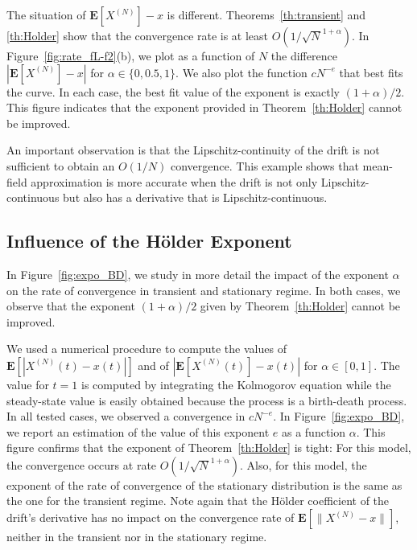 \documentclass[sigconf]{acmart}
\newcommand\XN{X^{(N)}}
\newcommand\sesp[1]{\mathbf{E}[#1]}
\newcommand\snorm[1]{\|#1\|}
\begin{document}
The situation of $\sesp{\XN}-x$ is
different. Theorems~\ref{th:transient} and \ref{th:Holder} show that
the convergence rate is at least $O(1/\sqrt{N}^{1+\alpha})$.  In
Figure~\ref{fig:rate_fL-f2}(b), we plot as a function of $N$ the
difference $|\sesp{\XN}-x|$ for $\alpha\in\{0,0.5,1\}$.  We also plot
the function $cN^{-e}$ that best fits the curve. In each case, the
best fit value of the exponent is exactly $(1+\alpha)/2$.  This figure
indicates that the exponent provided in Theorem~\ref{th:Holder} cannot
be improved.

An important observation is that the Lipschitz-continuity of the drift
is not sufficient to obtain an $O(1/N)$ convergence.  This example
shows that mean-field approximation is more accurate when the drift is
not only Lipschitz-continuous but also has a derivative that is
Lipschitz-continuous. 



\subsection{Influence of the Hölder Exponent}


In Figure~\ref{fig:expo_BD}, we study in more detail the impact of the
exponent $\alpha$ on the rate of convergence in transient and
stationary regime. In both cases, we observe that the exponent
$(1+\alpha)/2$ given by Theorem~\ref{th:Holder} cannot be improved.

We used a numerical procedure to compute the values of
$\sesp{|\XN(t)-x(t)|}$ and of $|\sesp{\XN(t)}-x(t)|$ for
$\alpha\in[0,1]$. The value for $t=1$ is computed by integrating the
Kolmogorov equation while the steady-state value is easily obtained
because the process is a birth-death process. In all tested cases, we
observed a convergence in $cN^{-e}$. In Figure~\ref{fig:expo_BD}, we
report an estimation of the value of this exponent $e$ as a function
$\alpha$.  This figure confirms that the exponent of
Theorem~\ref{th:Holder} is tight: For this model, the convergence
occurs at rate $O(1/\sqrt{N}^{1+\alpha})$.  Also, for this model, the
exponent of the rate of convergence of the stationary distribution is
the same as the one for the transient regime.  Note again that the
Hölder coefficient of the drift's derivative has no impact on the
convergence rate of $\sesp{\snorm{\XN-x}}$, neither in the transient
nor in the stationary regime.
\end{document}
